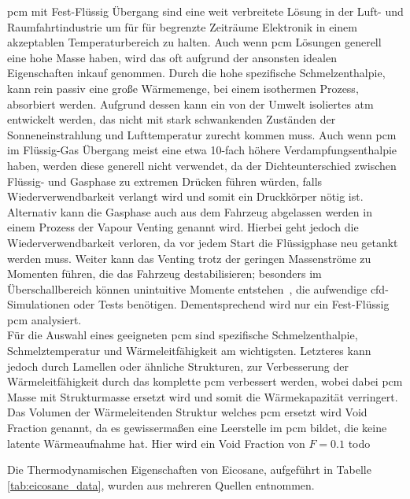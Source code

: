\ac{pcm} mit Fest-Flüssig Übergang sind eine weit verbreitete Lösung in der Luft- und Raumfahrtindustrie um für für begrenzte Zeiträume Elektronik in einem akzeptablen
Temperaturbereich zu halten. Auch wenn \ac{pcm} Lösungen generell eine hohe Masse haben, wird das oft aufgrund der ansonsten idealen Eigenschaften inkauf genommen.
Durch die hohe spezifische Schmelzenthalpie, kann rein passiv eine große Wärmemenge, bei einem isothermen Prozess, absorbiert werden. Aufgrund dessen
kann ein von der Umwelt isoliertes \ac{atm} entwickelt werden, das nicht mit stark schwankenden Zuständen der Sonneneinstrahlung und Lufttemperatur
zurecht kommen muss. Auch wenn \ac{pcm} im Flüssig-Gas Übergang meist eine etwa 10-fach höhere Verdampfungsenthalpie haben, werden diese
generell nicht verwendet, da der Dichteunterschied zwischen Flüssig- und Gasphase zu extremen Drücken führen würden, falls Wiederverwendbarkeit
verlangt wird und somit ein Druckkörper nötig ist. Alternativ kann die Gasphase auch aus dem Fahrzeug abgelassen werden in einem Prozess der
Vapour Venting genannt wird. Hierbei geht jedoch die Wiederverwendbarkeit verloren, da vor jedem Start die Flüssigphase neu getankt werden muss.
Weiter kann das Venting trotz der geringen Massenströme zu Momenten führen, die das Fahrzeug destabilisieren; besonders im Überschallbereich
können unintuitive Momente entstehen~\cite{Deere-2011}, die aufwendige \ac{cfd}-Simulationen oder Tests benötigen. Dementsprechend wird nur ein
Fest-Flüssig \ac{pcm} analysiert.\\

Für die Auswahl eines geeigneten \ac{pcm} sind spezifische Schmelzenthalpie, Schmelztemperatur und Wärmeleitfähigkeit am wichtigsten.
Letzteres kann jedoch durch Lamellen oder ähnliche Strukturen, zur Verbesserung der Wärmeleitfähigkeit durch das komplette \ac{pcm} verbessert werden,
wobei dabei \ac{pcm} Masse mit Strukturmasse ersetzt wird und somit die Wärmekapazität verringert. Das Volumen der Wärmeleitenden Struktur welches
\ac{pcm} ersetzt wird Void Fraction genannt, da es gewissermaßen eine Leerstelle im \ac{pcm} bildet, die keine latente Wärmeaufnahme hat. Hier
wird ein Void Fraction von $F = 0.1$ todo

Die Thermodynamischen Eigenschaften von Eicosane, aufgeführt in Tabelle \ref{tab:eicosane_data}, wurden aus mehreren Quellen entnommen.\\

